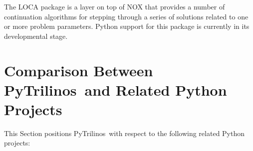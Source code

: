 \documentclass[acmtocl]{acmtrans2m}
\newcommand{\PyTrilinos}{{PyTrilinos}}
\begin{document}
The LOCA package is a layer on top of NOX that provides a number of
continuation algorithms for stepping through a series of solutions
related to one or more problem parameters.  Python support for this
package is currently in its developmental stage.

\section{Comparison Between \PyTrilinos\ and Related Python Projects}
\label{sec:comparison_python}

This Section positions \PyTrilinos\ with respect to the following
related Python projects:
\end{document}

